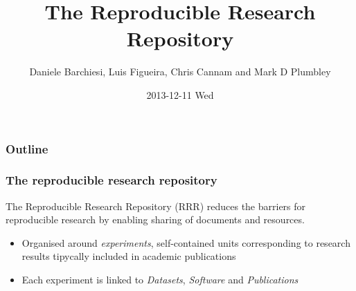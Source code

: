 \documentclass[bigger]{beamer}
\title{The Reproducible Research Repository}
\author{Daniele Barchiesi, Luis Figueira, Chris Cannam and Mark D Plumbley}
\date{2013-12-11 Wed}
\begin{document}
\maketitle

\begin{frame}
\frametitle{Outline}
\setcounter{tocdepth}{3}
\tableofcontents
\end{frame}
\begin{frame}
\frametitle{The reproducible research repository}
\label{sec-1}


The Reproducible Research Repository (RRR) reduces the barriers for reproducible research by enabling sharing of documents and resources.

\begin{itemize}
\item Organised around \emph{experiments}, self-contained units corresponding to research results tipycally included in academic publications
\item Each experiment is linked to \emph{Datasets}, \emph{Software} and \emph{Publications}
\end{itemize}
\end{frame}
\end{document}
